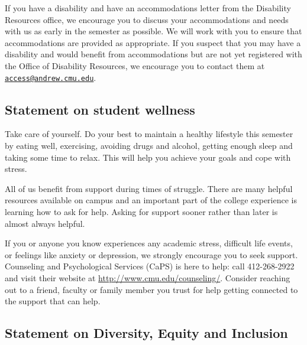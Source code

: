 \documentclass{article}
\begin{document}
If you have a disability and have an accommodations letter from the Disability
Resources office, we encourage you to discuss your accommodations and needs with
us as early in the semester as possible. We will work with you to ensure that
accommodations are provided as appropriate. If you suspect that you may have a
disability and would benefit from accommodations but are not yet registered with
the Office of Disability Resources, we encourage you to contact them at
\href{mailto:access@andrew.cmu.edu}{\texttt{access@andrew.cmu.edu}}.


\subsection*{Statement on student wellness}

Take care of yourself.  Do your best to maintain a healthy lifestyle this
semester by eating well, exercising, avoiding drugs and alcohol, getting enough
sleep and taking some time to relax. This will help you achieve your goals and
cope with stress.

All of us benefit from support during times of struggle. There are many helpful
resources available on campus and an important part of the college experience is
learning how to ask for help. Asking for support sooner rather than later is
almost always helpful.

If you or anyone you know experiences any academic stress, difficult life
events, or feelings like anxiety or depression, we strongly encourage you to
seek support. Counseling and Psychological Services (CaPS) is here to help: call
412-268-2922 and visit their website at \url{http://www.cmu.edu/counseling/}.
Consider reaching out to a friend, faculty or family member you trust for help
getting connected to the support that can help.


\subsection*{Statement on Diversity, Equity and Inclusion}
\end{document}
